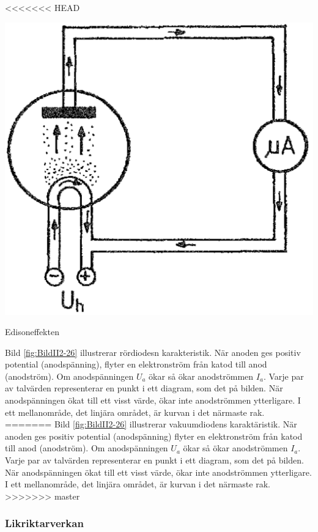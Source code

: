 <<<<<<< HEAD
\begin{marginfigure}%
\includegraphics[width=\textwidth]{images/cropped_pdfs/bild_2_2-25.pdf}
\caption{Edisoneffekten}
\label{fig:BildII2-25}
\end{marginfigure}

Bild \ref{fig:BildII2-26} illustrerar rördiodesn karakteristik. När
anoden ges positiv potential (anodspänning), flyter en elektronström
från katod till anod (anodström). Om anodspänningen \(U_a\) ökar så
ökar anodströmmen \(I_a\). Varje par av talvärden representerar en
punkt i ett diagram, som det på bilden. När anodspänningen ökat till
ett visst värde, ökar inte anodströmmen ytterligare. I ett
mellanområde, det linjära området, är kurvan i det närmaste rak.
=======
Bild \ref{fig:BildII2-26} illustrerar vakuumdiodens karaktäristik.
När anoden ges positiv potential (anodspänning) flyter en elektronström från
katod till anod (anodström).
Om anodspänningen \(U_a\) ökar så ökar anodströmmen \(I_a\).
Varje par av talvärden representerar en punkt i ett diagram, som det på bilden.
När anodspänningen ökat till ett visst värde, ökar inte anodströmmen ytterligare.
I ett mellanområde, det linjära området, är kurvan i det närmaste rak.
>>>>>>> master

\subsubsection{Likriktarverkan}

